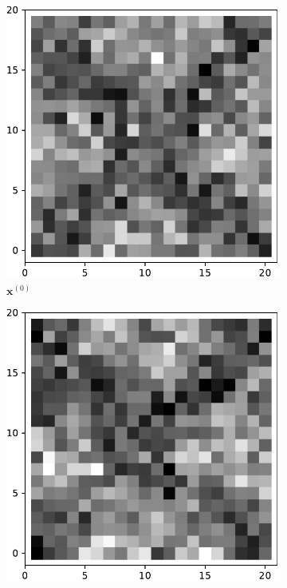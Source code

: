    \begin{figure}[!h]
        \centering
        \begin{subfigure}[b]{0.24\textwidth}
            \centering
            \includegraphics[width=\textwidth]{./img/ximage.pdf}
            \caption[]%
            {{\small $\mathbf{x}^{(0)}$}}    
            \label{fig:ximage6}
        \end{subfigure}
        \begin{subfigure}[b]{0.24\textwidth}  
            \centering 
            \includegraphics[width=\textwidth]{./img/15d2-0.pdf}

\end{subfigure}
\end{figure}
